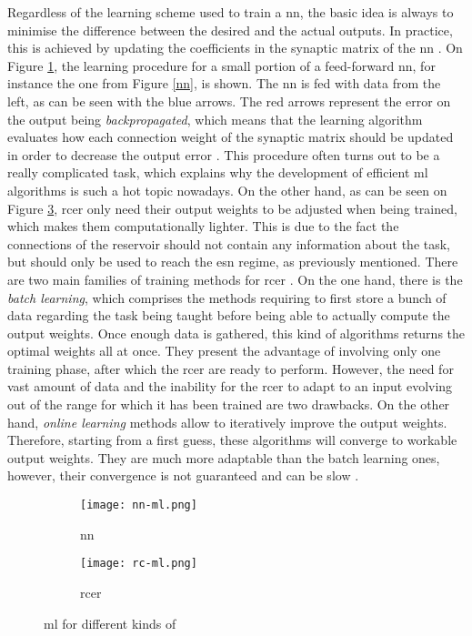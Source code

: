 Regardless of the learning scheme used to train a \gls{nn}, the basic idea is always to minimise the difference between the desired and the actual outputs. In practice, this is achieved by updating the coefficients in the synaptic matrix of the \gls{nn} \cite[p.233]{bishop2006pattern}\cite[p.733]{russell2010artificial}. On Figure \ref{nn-ml}, the learning procedure for a small portion of a feed-forward \gls{nn}, for instance the one from Figure \ref{nn}, is shown. The \gls{nn} is fed with data from the left, as can be seen with the blue arrows. The red arrows represent the error on the output being \emph{backpropagated}, which means that the learning algorithm evaluates how each connection weight of the synaptic matrix should be updated in order to decrease the output error \cite[p.241]{bishop2006pattern}. This procedure often turns out to be a really complicated task, which explains why the development of efficient \gls{ml} algorithms is such a hot topic nowadays. On the other hand, as can be seen on Figure \ref{rc-ml}, \gls{rcer} only need their output weights to be adjusted when being trained, which makes them computationally lighter\cite{Jaeger2004}. This is due to the fact the connections of the reservoir should not contain any information about the task, but should only be used to reach the \gls{esn} regime, as previously mentioned. There are two main families of training methods for \gls{rcer} \cite{Jaeger2002}. On the one hand, there is the \textit{batch learning}, which comprises the methods requiring to first store a bunch of data regarding the task being taught before being able to actually compute the output weights. Once enough data is gathered, this kind of algorithms returns the optimal weights all at once. They present the advantage of involving only one training phase, after which the \gls{rcer} are ready to perform. However, the need for vast amount of data and the inability for the \gls{rcer} to adapt to an input evolving out of the range for which it has been trained are two drawbacks. On the other hand, \textit{online learning} methods allow to iteratively improve the output weights. Therefore, starting from a first guess, these algorithms will converge to workable output weights. They are much more adaptable than the batch learning ones, however, their convergence is not guaranteed and can be slow \cite{JaegerTraining, schrauwen}.

\begin{figure}[h]
	\centering
	\begin{subfigure}{.5\textwidth}
		\centering
		\texttt{[image: nn-ml.png]}
		\caption{\acrlong{nn} \cite[p.244]{bishop2006pattern}}
		\label{nn-ml}
	\end{subfigure}%
	\begin{subfigure}{.5\textwidth}
		\centering
		\texttt{[image: rc-ml.png]}
		\caption{\acrlong{rcer} \cite{Goudarzi2014ACS}}
		\label{rc-ml}
	\end{subfigure}
	\caption{\acrlong{ml} for different kinds of }
\end{figure}

